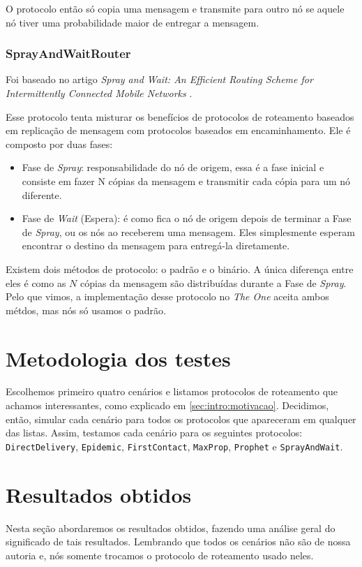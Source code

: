 \documentclass[conference]{IEEEtran}
\begin{document}
O protocolo então só copia uma mensagem e transmite para outro nó se aquele nó tiver uma probabilidade maior de entregar a mensagem.

\subsubsection{SprayAndWaitRouter}
Foi baseado no artigo \textit{Spray and Wait: An Efficient Routing Scheme for Intermittently Connected Mobile Networks} \cite{SprayAndWaitRouter:original}.

Esse protocolo tenta misturar os benefícios de protocolos de roteamento baseados em replicação de mensagem com protocolos baseados em encaminhamento. Ele é composto por duas fases:
\begin{itemize}
  \item Fase de \textit{Spray}: responsabilidade do nó de origem, essa é a fase inicial e consiste em fazer N cópias da mensagem e transmitir cada cópia para um nó diferente.
  \item Fase de \textit{Wait} (Espera): é como fica o nó de origem depois de terminar a Fase de \textit{Spray}, ou os nós ao receberem uma mensagem. Eles simplesmente esperam encontrar o destino da mensagem para entregá-la diretamente.
\end{itemize}

Existem dois métodos de protocolo: o padrão e o binário. A única diferença entre eles é como as $N$ cópias da mensagem são distribuídas durante a Fase de \textit{Spray}. Pelo que vimos, a implementação desse protocolo no \emph{The One} aceita ambos métdos, mas nós só usamos o padrão.

\section{Metodologia dos testes}
Escolhemos primeiro quatro cenários e listamos protocolos de roteamento que achamos interessantes, como explicado em \ref{sec:intro:motivacao}. Decidimos, então, simular cada cenário para todos os protocolos que apareceram em qualquer das listas. Assim, testamos cada cenário para os seguintes protocolos: \texttt{DirectDelivery}, \texttt{Epidemic}, \texttt{FirstContact}, \texttt{MaxProp}, \texttt{Prophet} e \texttt{SprayAndWait}.


\section{Resultados obtidos}
Nesta seção abordaremos os resultados obtidos, fazendo uma análise geral do significado de tais resultados. Lembrando que todos os cenários não são de nossa autoria e,
nós somente trocamos o protocolo de roteamento usado neles. 
\end{document}
